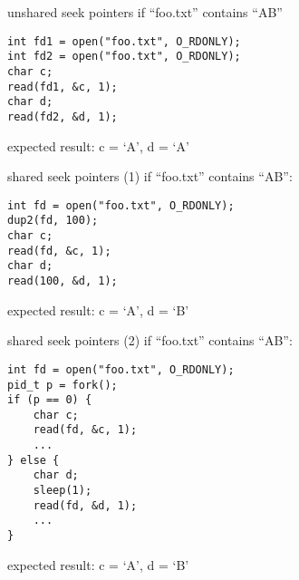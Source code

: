 

\begin{frame}[fragile]{unshared seek pointers}
if ``foo.txt'' contains ``AB''
\begin{Verbatim}[fontsize=\small]
int fd1 = open("foo.txt", O_RDONLY);
int fd2 = open("foo.txt", O_RDONLY);
char c;
read(fd1, &c, 1);
char d;
read(fd2, &d, 1);
\end{Verbatim}
expected result: c = `A', d = `A'
\end{frame}


\begin{frame}[fragile]{shared seek pointers (1)}
if ``foo.txt'' contains ``AB'':
\begin{Verbatim}[fontsize=\small]
int fd = open("foo.txt", O_RDONLY);
dup2(fd, 100);
char c;
read(fd, &c, 1);
char d;
read(100, &d, 1);
\end{Verbatim}
expected result: c = `A', d = `B'
\end{frame}

\begin{frame}[fragile]{shared seek pointers (2)}
if ``foo.txt'' contains ``AB'':
\begin{Verbatim}[fontsize=\small]
int fd = open("foo.txt", O_RDONLY);
pid_t p = fork();
if (p == 0) {
    char c;
    read(fd, &c, 1);
    ...
} else {
    char d;
    sleep(1);
    read(fd, &d, 1);
    ...
}
\end{Verbatim}
expected result: c = `A', d = `B'
\end{frame}

